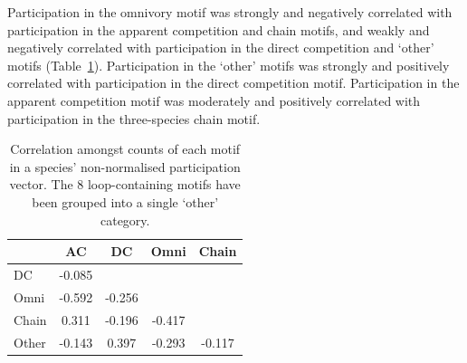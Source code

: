 \documentclass[12pt]{article}
\begin{document}
\begin{spacing}{2.0}
		Participation in the omnivory motif was strongly and negatively correlated with participation in the apparent competition and chain motifs, and weakly and negatively correlated with participation in the direct competition and `other' motifs (Table~\ref{tab:count_correlations}).
		Participation in the `other' motifs was strongly and positively correlated with participation in the direct competition motif.
		Participation in the apparent competition motif was moderately and positively correlated with participation in the three-species chain motif.


		\begin{table}[h!]
    		\caption{Correlation amongst counts of each motif in a species' non-normalised participation vector. The 8 loop-containing motifs have been grouped into a single `other' category.}
    		\label{tab:count_correlations}
    		\begin{tabular}{l | c c c c}
    			& AC & DC & Omni & Chain \\
    		\hline
    		DC    & -0.085 &        &        &        \\   
    		Omni  & -0.592 & -0.256 &        &        \\
    		Chain &  0.311 & -0.196 & -0.417 &        \\
    		Other & -0.143 &  0.397 & -0.293 & -0.117 \\
    		\hline
    		\end{tabular}
    		\end{table}


\end{spacing}
\end{document}
